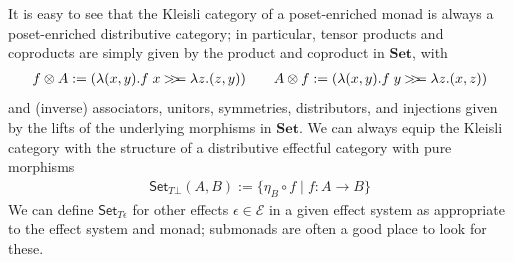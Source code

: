 \documentclass[acmsmall,screen,anonymous,review]{acmart}
\newcommand{\mc}[1]{\ensuremath{\mathcal{#1}}}
\newcommand{\mb}[1]{\ensuremath{\mathbf{#1}}}
\newcommand{\ms}[1]{\ensuremath{\mathsf{#1}}}
\newcommand{\obind}{\mathbin{>\!\!>\mkern-6.7mu=}}
\newcommand{\mbind}[3]{#2 \obind_{#1} #3}
\begin{document}
It is easy to see that the Kleisli category of a poset-enriched monad is
always a poset-enriched distributive category; in particular, tensor products and coproducts are
simply given by the product and coproduct in $\mb{Set}$, with
\begin{gather*}
  f \otimes A := (\lambda (x, y) . \mbind{}{f\;x}{\lambda z . (z, y)}) \qquad
  A \otimes f := (\lambda (x, y) . \mbind{}{f\;y}{\lambda z . (x, z)}) 
\end{gather*}
and (inverse) associators, unitors, symmetries, distributors, and injections given by the lifts of
the underlying morphisms in $\mb{Set}$. We can always equip the Kleisli category with the structure
of a distributive effectful category with pure morphisms
\begin{align*}
  \ms{Set}_{T\bot}(A, B) := \{\eta_B \circ f \mid f : A \to B\}
\end{align*}
We can define $\ms{Set}_{T\epsilon}$ for other effects $\epsilon \in \mc{E}$ in a given effect
system as appropriate to the effect system and monad; submonads are often a good place to look for
these.
\end{document}

